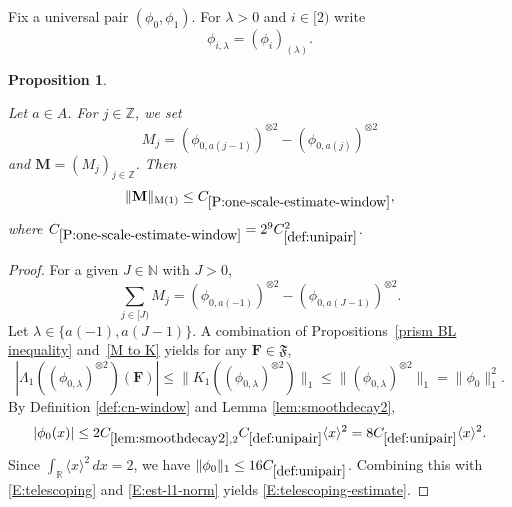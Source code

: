 \documentclass[12pt,reqno]{amsart}
\theoremstyle{plain}
\newtheorem{proposition}[theorem]{Proposition}
\numberwithin{equation}{section}
\theoremstyle{remark}
\newcommand{\uses}[1]{}
\newcommand{\usesdefs}[1]{}
\newcommand{\leanok}{}
\newcommand{\lean}[1]{}
\newcommand{\Z}{{\mathbb Z}}
\newcommand{\R}{{\mathbb R}}
\begin{document}
Fix a universal pair $(\phi_0,\phi_1)$. For $\lambda>0$ and $i\in[2)$ write
\begin{equation}\label{auto:rescaled-window-continuous-notation} \phi_{i,\lambda} = (\phi_i)_{(\lambda)}. \end{equation}

\begin{proposition}\label{P:one-scale-estimate-window}\uses{prism BL inequality,M to K,lem:smoothdecay2}\usesdefs{bracket bump,normalized function tuples,auto:prism-form-definition,multiplicatively spaced monotone sequences,kernel sequences,def:cn-window,def:unipair}
\lean{Auto.oneScaleEstimateWindow}
\leanok
Let $a\in A$. For $j\in \Z$, we set
\begin{equation}\label{auto:one-scale-window-kernel}
M_j=(\phi_{0,a(j-1)})^{\otimes 2} - (\phi_{0,a(j)})^{\otimes 2}
\end{equation}
and $\mathbf{M}=(M_j)_{j\in \Z}$. Then
\begin{equation}\label{E:telescoping-estimate}
\|\mathbf{M}\|_{\rm M(1)} \leq C_{\ref{P:one-scale-estimate-window}},
\end{equation}
where $C_{\ref{P:one-scale-estimate-window}}=2^9C_{\ref{def:unipair}}^2$.


\end{proposition}

\begin{proof}
For a given $J\in \mathbb N$ with $J>0$,
\begin{equation}\label{E:telescoping}
\sum_{j\in [J)} M_j=(\phi_{0,a(-1)})^{\otimes 2}-(\phi_{0,a(J-1)})^{\otimes 2}.
\end{equation}
Let $\lambda \in \{a(-1), a(J-1)\}$.
A combination of Propositions~\ref{prism BL inequality} and~\ref{M to K} yields for any $\mathbf{F} \in \mathfrak{F}$,
\begin{equation}\label{E:est-l1-norm}
|\Lambda_1 ((\phi_{0,\lambda})^{\otimes 2})(\mathbf{F})| \leq
\|K_1((\phi_{0,\lambda})^{\otimes 2})\|_1 \leq\|(\phi_{0,\lambda})^{\otimes 2}\|_1
=\|\phi_0\|_1^2.
\end{equation}
By Definition \ref{def:cn-window} and Lemma \ref{lem:smoothdecay2},
\begin{equation}\label{E:est-of-l1-norm}
|\phi_0(x)|
\le 2C_{\ref{lem:smoothdecay2},2}C_{\ref{def:unipair}}\langle x\rangle^2
=8C_{\ref{def:unipair}}\langle x\rangle^2.
\end{equation}
Since $\int_\R\langle x\rangle^2\,dx=2$, we have $\|\phi_0\|_1\le16C_{\ref{def:unipair}}$. Combining this with \eqref{E:telescoping} and \eqref{E:est-l1-norm} yields \eqref{E:telescoping-estimate}.
\end{proof}
\end{document}
